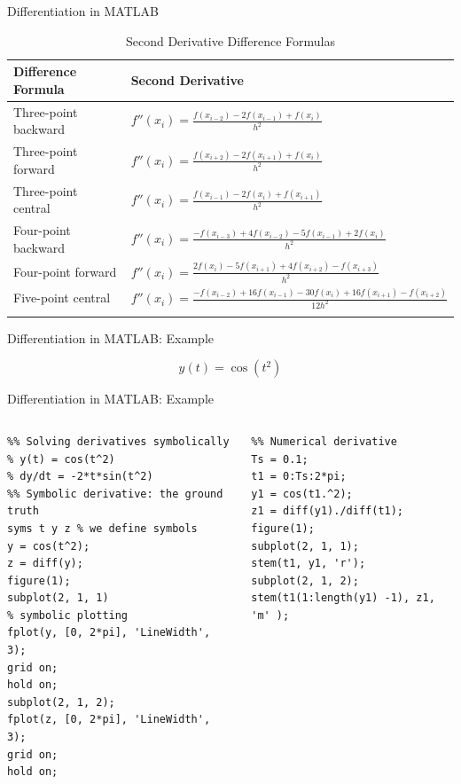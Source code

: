 \documentclass[aspectratio=169,xcolor=dvipsnames,svgnames,x11names,fleqn]{beamer}
\begin{document}
\begin{frame}{Differentiation in MATLAB}

\footnotesize


\begin{table}[h]
\centering
\caption{Second Derivative Difference Formulas}
\begin{tabular}{ll}
\hline
\textbf{Difference Formula} & \textbf{Second Derivative} \\
\hline
Three-point backward & $f''(x_i) = \frac{f(x_{i-2}) - 2f(x_{i-1}) + f(x_i)}{h^2}$ \\
Three-point forward & $f''(x_i) = \frac{f(x_{i+2}) - 2f(x_{i+1}) + f(x_i)}{h^2}$ \\
Three-point central & $f''(x_i) = \frac{f(x_{i-1}) - 2f(x_i) + f(x_{i+1})}{h^2}$ \\
Four-point backward & $f''(x_i) = \frac{-f(x_{i-3}) + 4f(x_{i-2}) - 5f(x_{i-1}) + 2f(x_i)}{h^2}$ \\
Four-point forward & $f''(x_i) = \frac{2f(x_i) - 5f(x_{i+1}) + 4f(x_{i+2}) - f(x_{i+3})}{h^2}$ \\
Five-point central & $f''(x_i) = \frac{-f(x_{i-2}) + 16f(x_{i-1}) - 30f(x_i) + 16f(x_{i+1}) - f(x_{i+2})}{12h^2}$ \\ \\
\hline
\end{tabular}
\end{table}

\end{frame}

\begin{frame}[containsverbatim]{Differentiation in MATLAB: Example}

\Large 

    $$
    y(t) = \cos(t^2)
    $$
\end{frame}
\begin{frame}[containsverbatim]{Differentiation in MATLAB: Example}
    \footnotesize
\begin{columns}
    \begin{verbatim}
%% Solving derivatives symbolically
% y(t) = cos(t^2)
% dy/dt = -2*t*sin(t^2)
%% Symbolic derivative: the ground truth
syms t y z % we define symbols
y = cos(t^2);
z = diff(y);
figure(1);
subplot(2, 1, 1)
% symbolic plotting
fplot(y, [0, 2*pi], 'LineWidth', 3);
grid on;
hold on;
subplot(2, 1, 2);
fplot(z, [0, 2*pi], 'LineWidth', 3);
grid on;
hold on;
    \end{verbatim}
    \begin{verbatim}
%% Numerical derivative
Ts = 0.1;
t1 = 0:Ts:2*pi;
y1 = cos(t1.^2);
z1 = diff(y1)./diff(t1);
figure(1);
subplot(2, 1, 1);
stem(t1, y1, 'r');
subplot(2, 1, 2);
stem(t1(1:length(y1) -1), z1, 'm' );

    \end{verbatim}
\end{columns}
\end{frame}
\end{document}
